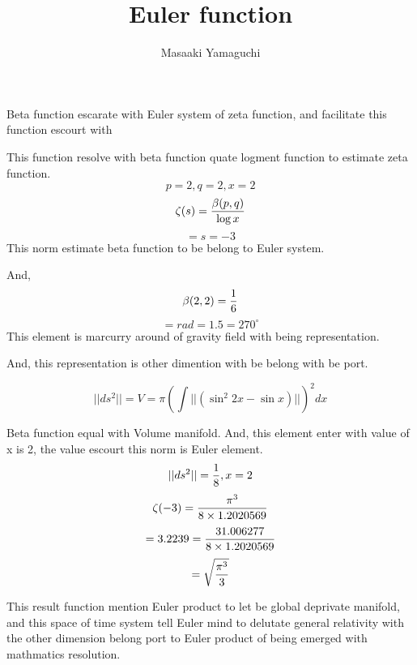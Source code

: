 \documentclass{jsarticle}
\begin{document}
\title{Euler function}
\author{Masaaki Yamaguchi}
\date{}
\maketitle


    Beta function escarate with Euler system of zeta function,
  and facilitate this function escourt with 


    This function resolve with beta function quate logment function to
  estimate zeta function.
  $$ p=2,q=2,x=2 $$
  $$ \zeta(s) = {{\beta(p,q)} \over {\log x}} $$
  $$ = s = -3 $$
    This norm estimate beta function to be belong to Euler system.

  And, 
  $$ \beta(2,2) = {1 \over 6} $$
  $$ = rad = 1.5 = 270^{\circ} $$
  This element is marcurry around of gravity field with being representation.

  And, this representation is other dimention with be belong with be port.

  $$ ||ds^2|| = V = \pi \left(\int {||(\sin^{2}2x - \sin x)||}\right)^{2} dx $$


    Beta function equal with Volume manifold.
  And, this element enter with value of x is 2, the value escourt this norm
  is Euler element.
  $$ ||ds^2|| = {1 \over 8}, x = 2  $$
  $$ \zeta(-3) = { \pi^{3} \over {8 \times 1.2020569}} $$
  $$ = 3.2239 = {31.006277 \over {8 \times 1.2020569}} $$
  $$ = \sqrt{{\pi^{3} \over 3}} $$


    This result function mention Euler product to let be global
  deprivate manifold, and this space of time system tell Euler mind
  to delutate general relativity with the other dimension belong port to
  Euler product of being emerged with mathmatics resolution.
\end{document}
